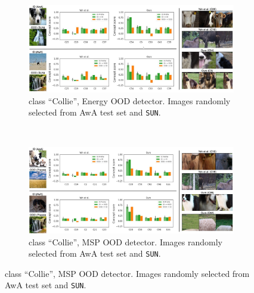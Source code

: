 \begin{figure}[b]
  \centering
  \begin{subfigure}{\linewidth}
    \includegraphics[width=\textwidth]{figures/energy_SUN_Collie.jpg}
    \caption{class ``Collie'', Energy OOD detector. Images randomly selected from AwA test set and \texttt{SUN}.}
  \end{subfigure}
  \\
  \begin{subfigure}{\linewidth}
    \includegraphics[width=\textwidth]{figures/MSP_SUN_Collie.jpg}
    \caption{class ``Collie'', MSP OOD detector. Images randomly selected from AwA test set and \texttt{SUN}.}
  \end{subfigure}
\label{fig:expl-additional}
\end{figure}
  
